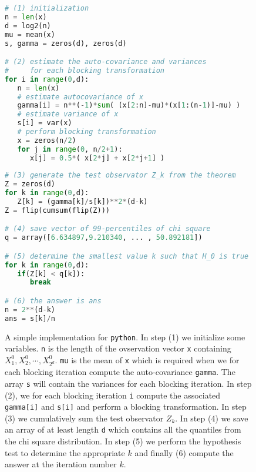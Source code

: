 \documentclass[11pt,english,a4paper]{article}
\begin{document}
\begin{figure}[!h]
\begin{center}
\begin{lstlisting}[language=python]
# (1) initialization
n = len(x)
d = log2(n)
mu = mean(x)
s, gamma = zeros(d), zeros(d)

# (2) estimate the auto-covariance and variances 
#     for each blocking transformation
for i in range(0,d):
   n = len(x)
   # estimate autocovariance of x
   gamma[i] = n**(-1)*sum( (x[2:n]-mu)*(x[1:(n-1)]-mu) )
   # estimate variance of x
   s[i] = var(x)
   # perform blocking transformation
   x = zeros(n/2)
   for j in range(0, n/2+1):
      x[j] = 0.5*( x[2*j] + x[2*j+1] )
  
# (3) generate the test observator Z_k from the theorem      
Z = zeros(d)
for k in range(0,d):
   Z[k] = (gamma[k]/s[k])**2*(d-k)
Z = flip(cumsum(flip(Z)))

# (4) save vector of 99-percentiles of chi square
q = array([6.634897,9.210340, ... , 50.892181])

# (5) determine the smallest value k such that H_0 is true
for k in range(0,d):
   if(Z[k] < q[k]):
      break

# (6) the answer is ans
n = 2**(d-k)
ans = s[k]/n
\end{lstlisting}
\caption{A simple implementation for \texttt{python}. In step (1) we initialize some variables. \texttt{n} is the length of the ovservation vector \texttt{x} containing $X_1^{0}, X_2^{0}, \cdots, X_{2^d}^{0}$. \texttt{mu} is the mean of \texttt{x} which is required when we for each blocking iteration compute the auto-covariance \texttt{gamma}. The array \texttt{s} will contain the variances for each blocking iteration. In step (2), we for each blocking iteration \texttt{i} compute the associated \texttt{gamma[i]} and \texttt{s[i]} and perform a blocking transformation. In step (3) we cumulatively sum the test observator $Z_k$. In step (4) we save an array of at least length \texttt{d} which contains all the quantiles from the chi square distribution. In step (5) we perform the hypothesis test to determine the appropriate $k$ and finally (6) compute the answer at the iteration number $k$.}
\end{center}
\end{figure}
\end{document}
